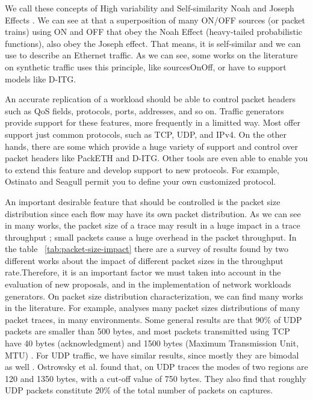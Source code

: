 We call these concepts of High variability and Self-similarity Noah and Joseph Effects \cite{selfsimilar-highvariability}. We can see at\cite{selfsimilar-highvariability} that a superposition of many ON/OFF sources (or packet trains) using ON and OFF that obey the Noah Effect (heavy-tailed probabilistic functions), also obey the Joseph effect. That means, it is self-similar and we can use to describe an Ethernet traffic. As we can see, some works on the literature on synthetic traffic uses this principle, like sourcesOnOff\cite{sourcesonoff-paper}, or have to support models like D-ITG\cite{ditg-paper}.


An accurate replication of a workload should be able to control packet headers such as QoS fields, protocols, ports, addresses, and so on. Traffic generators provide support for these features, more frequently in a limitted way. Most offer support just common protocols, such as TCP, UDP, and IPv4. On the other hands, there are some which provide a huge variety of support and control over packet headers like PackETH\cite{web-packeth} and D-ITG. Other tools are even able to enable you to extend this feature and develop support to new protocols. For example, Ostinato and Seagull permit you to define your own customized protocol.


An important desirable feature that should be controlled is the packet size distribution since each flow may have its own packet distribution. As we can see in many works, the packet size of a trace may result in a huge impact in a trace throughput \cite{stochartic-selfsimilar}\cite{performance-trafficgen}; small packets cause a huge overhead in the packet throughput. In the table ~\ref{tab:packet-size-impact} there are a survey of results found by two different works \cite{comparative-trafficgen-tools} \cite{performance-trafficgen} about the impact of different packet sizes in the throughput rate.Therefore, it is an important factor we must taken into account in the evaluation of new proposals, and in the implementation of network workloads generators. On packet size distribution characterization, we can find many works in the literature. For example, \cite{packet-distribution-model} analyses many packet sizes distributions of many packet traces, in many environments. Some general results are that 90\% of UDP packets are smaller than 500 bytes, and most packets transmitted using TCP have 40 bytes (acknowledgment) and 1500 bytes (Maximum Transmission Unit, MTU) \cite{packet-distribution-model}. For UDP traffic, we have similar results, since mostly they are bimodal as well \cite{udp-flows-model}. Ostrowsky et al.\cite{udp-flows-model} found that, on UDP traces the modes of two regions are 120 and 1350 bytes, with a cut-off value of 750 bytes. They also find that roughly UDP packets constitute 20\% of the total number of packets on captures. 


